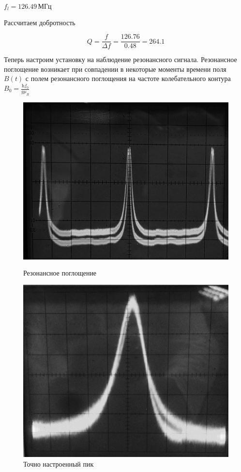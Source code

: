 \documentclass[a4paper,12pt]{article}
\begin{document}
	$f_{l} = 126.49 \, \text{МГц}$
	
	Рассчитаем добротность
    
    $$ Q = \frac{f}{\Delta f} = \frac{126.76}{0.48} = 264.1 $$
    
    Теперь настроим установку на наблюдение резонансного сигнала. Резонансное поглощение возникает при совпадении в некоторые моменты времени поля $B(t)$ с полем резонансного поглощения на частоте колебательного контура $B_0=\frac{\mathrm{h}f_0}{g\mu_B}$
    
    \begin{figure}[h!]
			\begin{center}
				\begin{minipage}{0.49\linewidth}
					\includegraphics[width=\linewidth]{oscilloscope.jpg}
					\caption{Резонансное поглощение}
				\end{minipage}
				\hfill
				\begin{minipage}{0.49\linewidth}
					\includegraphics[width=\linewidth]{second.jpg}
					\caption{Точно настроенный пик}
				\end{minipage}
			\end{center}
		\end{figure}
\end{document}
